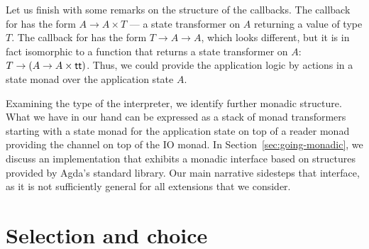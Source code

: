 \documentclass[acmsmall,screen]{acmart}
\begin{document}
Let us finish with some remarks on the structure of the callbacks. The
callback for {\ACSEND} has the form $A \to A \times T$ --- a state
transformer on $A$ returning a value of type $T$. The callback for
{\ACRECV} has the form $T \to A \to A$, which looks different, but it
is in fact isomorphic to a function that returns a state transformer
on $A$:
$T \to (A \to A \times \Att)$. Thus, we could provide the
application logic by actions in a state monad over the application
state $A$.

Examining the type of the interpreter, we identify further monadic
structure. What we have in our hand can be expressed as a stack of monad transformers starting with a state
monad for the application state on top of a reader monad providing the
channel on top of the IO monad. In Section~\ref{sec:going-monadic},
we discuss an implementation that exhibits a monadic interface based
on structures provided by Agda's standard library.
Our main narrative sidesteps that interface, as it is not sufficiently
general for all extensions that we consider.

\section{Selection and choice}
\label{sec:select-choice}
\end{document}
